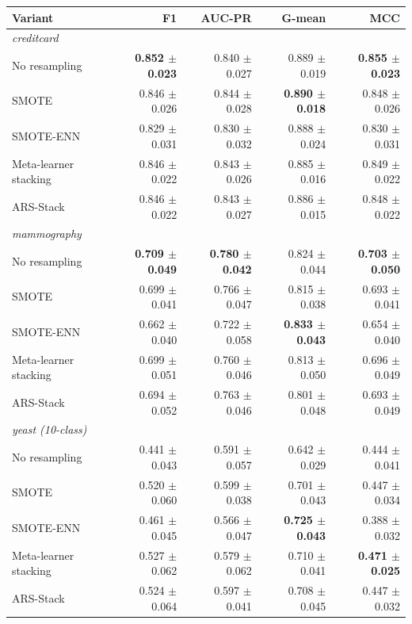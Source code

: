\begin{tabular}{lrrrr}
\toprule
Variant & F1 & AUC-PR & G-mean & MCC \\
\midrule
\multicolumn{5}{l}{\textit{creditcard}} \\
\quad No resampling & \textbf{0.852 $\pm$ 0.023} & 0.840 $\pm$ 0.027 & 0.889 $\pm$ 0.019 & \textbf{0.855 $\pm$ 0.023} \\
\quad SMOTE & 0.846 $\pm$ 0.026 & 0.844 $\pm$ 0.028 & \textbf{0.890 $\pm$ 0.018} & 0.848 $\pm$ 0.026 \\
\quad SMOTE-ENN & 0.829 $\pm$ 0.031 & 0.830 $\pm$ 0.032 & 0.888 $\pm$ 0.024 & 0.830 $\pm$ 0.031 \\
\quad Meta-learner stacking & 0.846 $\pm$ 0.022 & 0.843 $\pm$ 0.026 & 0.885 $\pm$ 0.016 & 0.849 $\pm$ 0.022 \\
\quad ARS-Stack & 0.846 $\pm$ 0.022 & 0.843 $\pm$ 0.027 & 0.886 $\pm$ 0.015 & 0.848 $\pm$ 0.022 \\
\multicolumn{5}{l}{\textit{mammography}} \\
\quad No resampling & \textbf{0.709 $\pm$ 0.049} & \textbf{0.780 $\pm$ 0.042} & 0.824 $\pm$ 0.044 & \textbf{0.703 $\pm$ 0.050} \\
\quad SMOTE & 0.699 $\pm$ 0.041 & 0.766 $\pm$ 0.047 & 0.815 $\pm$ 0.038 & 0.693 $\pm$ 0.041 \\
\quad SMOTE-ENN & 0.662 $\pm$ 0.040 & 0.722 $\pm$ 0.058 & \textbf{0.833 $\pm$ 0.043} & 0.654 $\pm$ 0.040 \\
\quad Meta-learner stacking & 0.699 $\pm$ 0.051 & 0.760 $\pm$ 0.046 & 0.813 $\pm$ 0.050 & 0.696 $\pm$ 0.049 \\
\quad ARS-Stack & 0.694 $\pm$ 0.052 & 0.763 $\pm$ 0.046 & 0.801 $\pm$ 0.048 & 0.693 $\pm$ 0.049 \\
\multicolumn{5}{l}{\textit{yeast (10-class)}} \\
\quad No resampling & 0.441 $\pm$ 0.043 & 0.591 $\pm$ 0.057 & 0.642 $\pm$ 0.029 & 0.444 $\pm$ 0.041 \\
\quad SMOTE & 0.520 $\pm$ 0.060 & 0.599 $\pm$ 0.038 & 0.701 $\pm$ 0.043 & 0.447 $\pm$ 0.034 \\
\quad SMOTE-ENN & 0.461 $\pm$ 0.045 & 0.566 $\pm$ 0.047 & \textbf{0.725 $\pm$ 0.043} & 0.388 $\pm$ 0.032 \\
\quad Meta-learner stacking & 0.527 $\pm$ 0.062 & 0.579 $\pm$ 0.062 & 0.710 $\pm$ 0.041 & \textbf{0.471 $\pm$ 0.025} \\
\quad ARS-Stack & 0.524 $\pm$ 0.064 & 0.597 $\pm$ 0.041 & 0.708 $\pm$ 0.045 & 0.447 $\pm$ 0.032 \\
\bottomrule
\end{tabular}
